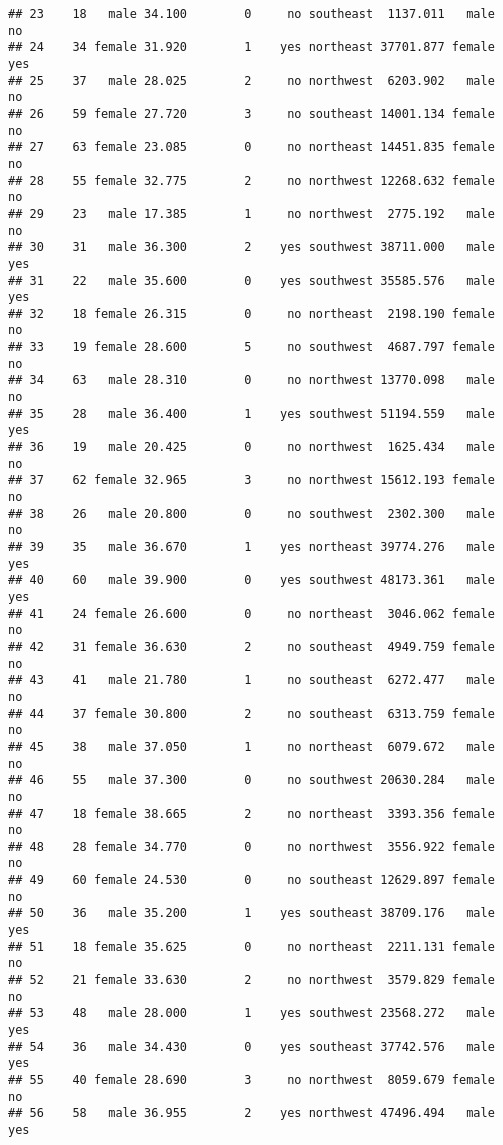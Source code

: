 \documentclass[
]{article}
\begin{document}
\begin{verbatim}
## 23    18   male 34.100        0     no southeast  1137.011   male       no
## 24    34 female 31.920        1    yes northeast 37701.877 female      yes
## 25    37   male 28.025        2     no northwest  6203.902   male       no
## 26    59 female 27.720        3     no southeast 14001.134 female       no
## 27    63 female 23.085        0     no northeast 14451.835 female       no
## 28    55 female 32.775        2     no northwest 12268.632 female       no
## 29    23   male 17.385        1     no northwest  2775.192   male       no
## 30    31   male 36.300        2    yes southwest 38711.000   male      yes
## 31    22   male 35.600        0    yes southwest 35585.576   male      yes
## 32    18 female 26.315        0     no northeast  2198.190 female       no
## 33    19 female 28.600        5     no southwest  4687.797 female       no
## 34    63   male 28.310        0     no northwest 13770.098   male       no
## 35    28   male 36.400        1    yes southwest 51194.559   male      yes
## 36    19   male 20.425        0     no northwest  1625.434   male       no
## 37    62 female 32.965        3     no northwest 15612.193 female       no
## 38    26   male 20.800        0     no southwest  2302.300   male       no
## 39    35   male 36.670        1    yes northeast 39774.276   male      yes
## 40    60   male 39.900        0    yes southwest 48173.361   male      yes
## 41    24 female 26.600        0     no northeast  3046.062 female       no
## 42    31 female 36.630        2     no southeast  4949.759 female       no
## 43    41   male 21.780        1     no southeast  6272.477   male       no
## 44    37 female 30.800        2     no southeast  6313.759 female       no
## 45    38   male 37.050        1     no northeast  6079.672   male       no
## 46    55   male 37.300        0     no southwest 20630.284   male       no
## 47    18 female 38.665        2     no northeast  3393.356 female       no
## 48    28 female 34.770        0     no northwest  3556.922 female       no
## 49    60 female 24.530        0     no southeast 12629.897 female       no
## 50    36   male 35.200        1    yes southeast 38709.176   male      yes
## 51    18 female 35.625        0     no northeast  2211.131 female       no
## 52    21 female 33.630        2     no northwest  3579.829 female       no
## 53    48   male 28.000        1    yes southwest 23568.272   male      yes
## 54    36   male 34.430        0    yes southeast 37742.576   male      yes
## 55    40 female 28.690        3     no northwest  8059.679 female       no
## 56    58   male 36.955        2    yes northwest 47496.494   male      yes

\end{verbatim}
\end{document}
